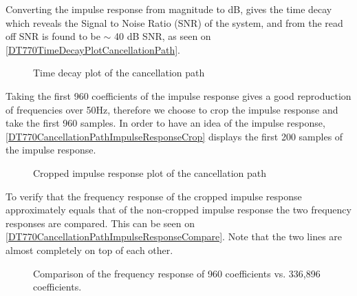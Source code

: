 Converting the impulse response from magnitude to dB, gives the time decay which reveals the Signal to Noise Ratio (SNR) of the system, and from the read off SNR is found to be $\sim$ 40 dB SNR, as seen on \autoref{DT770TimeDecayPlotCancellationPath}.


\begin{figure}[H]
	\centering
	
	\caption{Time decay plot of the cancellation path}
	\label{DT770TimeDecayPlotCancellationPath}
\end{figure}

Taking the first 960 coefficients of the impulse response gives a good reproduction of frequencies over 50Hz, therefore we choose to crop the impulse response and take the first 960 samples.
In order to have an idea of the impulse response,  \autoref{DT770CancellationPathImpulseResponseCrop} displays the first 200 samples of the impulse response.


\begin{figure}[H]
	\centering
	
	\caption{Cropped impulse response plot of the cancellation path}
	\label{DT770CancellationPathImpulseResponseCrop}
\end{figure}

To verify that the frequency response of the cropped impulse response approximately equals that of the non-cropped impulse response the two frequency responses are compared. This can be seen on \autoref{DT770CancellationPathImpulseResponseCompare}. Note that the two lines are almost completely on top of each other.

\begin{figure}[H]
	\centering
	
	\caption{Comparison of the frequency response of 960 coefficients vs. 336,896 coefficients.}
	\label{DT770CancellationPathImpulseResponseCompare}
\end{figure}

